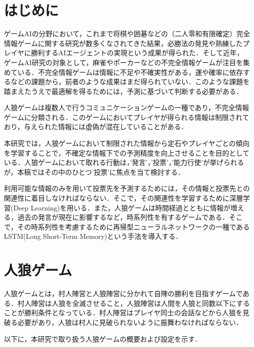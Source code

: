 \documentclass{jarticle}
\begin{document}
\maketitle

\section{はじめに}
ゲームAIの分野において，これまで将棋や囲碁などの（二人零和有限確定）完全情報ゲームに関する研究が数多くなされてきた結果，必勝法の発見や熟練したプレイヤに勝利するAIエージェントの実現という成果が得られた．そして近年，ゲームAI研究の対象として，麻雀やポーカーなどの不完全情報ゲームが注目を集めている．不完全情報ゲームは情報に不足や不確実性がある，運や確率に依存するなどの課題から，前者のような成果はまだ得られていない．このような課題を踏まえたうえで最適解を得るためには，予測に基づいて判断する必要がある．\par
人狼ゲームは複数人で行うコミュニケーションゲームの一種であり，不完全情報ゲームに分類される．このゲームにおいてプレイヤが得られる情報は制限されており，与えられた情報には虚偽が混在していることがある．\par
本研究では，人狼ゲームにおいて制限された情報から定石やプレイヤごとの傾向を学習することで，不確定な情報下での予測精度を向上させることを目的としている．人狼ゲームにおいて取れる行動は，'発言'，'投票'，'能力行使'が挙げられるが，本稿ではその中のひとつ'投票'に焦点を当て検討する．\par
利用可能な情報のみを用いて投票先を予測するためには，その情報と投票先との関連性に着目しなければならない．そこで，その関連性を学習するために深層学習(Deep Learning)を用いる．また，人狼ゲームは時間経過とともに情報が増える，過去の発言が現在に影響するなど，時系列性を有するゲームである．そこで，その時系列性を考慮するために再帰型ニューラルネットワークの一種であるLSTM(Long Short-Term Memory)\cite{LSTM}という手法を導入する．\par

\section{人狼ゲーム}
人狼ゲームとは，村人陣営と人狼陣営に分かれて自陣の勝利を目指すゲームである．村人陣営は人狼を全滅させること，人狼陣営は人間を人狼と同数以下にすることが勝利条件となっている．村人陣営はプレイヤ同士の会話などから人狼を見破る必要があり，人狼は村人に見破られないように振舞わなければならない．\par
以下に，本研究で取り扱う人狼ゲームの概要および設定を示す．
\end{document}
